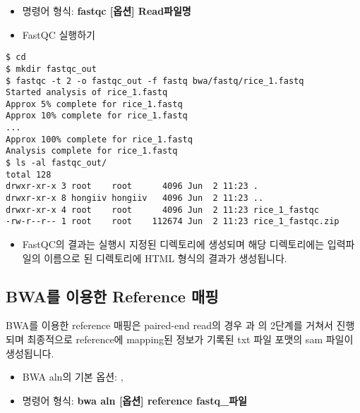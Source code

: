 \documentclass{article}
\begin{document}
\begin{itemize}
\item
  \begin{itemize}
  명령어 형식: \textbf{fastqc [옵션] Read파일명}
  \end{itemize}
\end{itemize}

\begin{itemize}
\item
  \begin{itemize}
  FastQC 실행하기  
  \end{itemize}
\end{itemize}
\begin{lstlisting}[frame=single,style=Bash,xleftmargin=1.4cm,xrightmargin=1.4cm]
$ cd
$ mkdir fastqc_out
$ fastqc -t 2 -o fastqc_out -f fastq bwa/fastq/rice_1.fastq 
Started analysis of rice_1.fastq
Approx 5% complete for rice_1.fastq
Approx 10% complete for rice_1.fastq
...
Approx 100% complete for rice_1.fastq
Analysis complete for rice_1.fastq
$ ls -al fastqc_out/
total 128
drwxr-xr-x 3 root    root      4096 Jun  2 11:23 .
drwxr-xr-x 8 hongiiv hongiiv   4096 Jun  2 11:23 ..
drwxr-xr-x 4 root    root      4096 Jun  2 11:23 rice_1_fastqc
-rw-r--r-- 1 root    root    112674 Jun  2 11:23 rice_1_fastqc.zip
\end{lstlisting}

\begin{itemize}
\item
  \begin{itemize}
  FastQC의 결과는 실행시 지정된 디렉토리에 생성되며 해당 디렉토리에는 입력파일의 이름으로 된 디렉토리에 HTML 형식의 결과가 생성됩니다.
  \end{itemize}
\end{itemize}

\subsection{BWA를 이용한 Reference 매핑}
BWA를 이용한 reference 매핑은 paired-end read의 경우 과 의 2단계를 거쳐서 진행되며 최종적으로 reference에 mapping된 정보가 기록된 txt 파일 포맷의 sam 파일이 생성됩니다.

\begin{itemize}
\item
  \begin{itemize}
   BWA aln의 기본 옵션: , 
  \end{itemize}
\end{itemize}
\begin{itemize}
\item
  \begin{itemize}
   명령어 형식: \textbf{bwa aln [옵션] reference fastq\_파일}
  \end{itemize}
\end{itemize}
\end{document}
